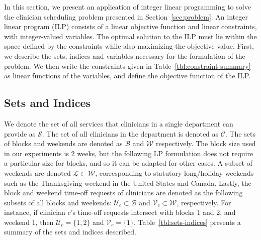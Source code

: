 In this section, we present an application of integer linear programming to solve the clinician
scheduling problem presented in Section~\ref{sec:problem}. 
An integer linear program (ILP) consists of a linear objective function and linear constraints,
with integer-valued variables. The optimal solution to the ILP must lie within the space
defined by the constraints while also maximizing the objective value.
First, we describe
the sets, indices and variables necessary for the formulation of the problem. We
then write the constraints given in Table~\ref{tbl:constraint-summary} as
linear functions of the variables, and define the objective function of the ILP.

\subsection{Sets and Indices}\label{sec:meth-sets-indices}
We denote the set of all services
that clinicians in a single department can provide as $\mathcal{S}$. 
The set of all clinicians in the department is denoted as
$\mathcal{C}$. The sets of blocks and weekends
are denoted as $\mathcal{B}$ and $\mathcal{W}$ respectively. The block size
used in our experiments is 2 weeks, but the following LP formulation does not
require a particular size for blocks, and so it can be adapted for other cases.
A subset of weekends are denoted $\mathcal{L} \subset \mathcal{W}$, corresponding to statutory
long/holiday weekends such as the Thanksgiving weekend in the United States and Canada. Lastly,
the block and weekend time-off requests of clinicians are denoted as the following
subsets of all blocks and weekends: $\mathcal{U}_c \subset \mathcal{B}$ and $\mathcal{V}_c \subset \mathcal{W}$, respectively.
For instance, if clinician $c$'s time-off requests intersect with blocks 1 and 2, and weekend
1, then $\mathcal{U}_c = \{1, 2\}$ and $\mathcal{V}_c = \{1\}$. Table~\ref{tbl:sets-indices} presents a summary of the sets and indices described. 

